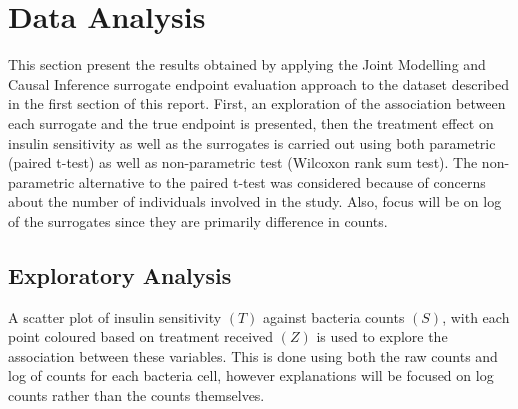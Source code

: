 \documentclass[a4paper,12pt]{article}
\begin{document}
	\section{Data Analysis}
	This section present the results obtained by applying the Joint Modelling and Causal Inference surrogate endpoint evaluation approach to the dataset described in the first section of this report. First, an exploration of the association between each surrogate and the true endpoint is presented, then the treatment effect on insulin sensitivity as well as the surrogates is carried out using both parametric (paired t-test\citep{DNAmicroarray}) as well as non-parametric test (Wilcoxon rank sum test\citep{DNAmicroarray}). The non-parametric alternative to the paired t-test was considered because of concerns about the number of individuals involved in the study. Also, focus will be on log of the surrogates since they are primarily difference in counts.
	
	\subsection{Exploratory Analysis}
	A scatter plot of insulin sensitivity $(T)$ against bacteria counts $(S)$, with each point coloured based on treatment received $(Z)$ is used to explore the association between these variables. This is done using both the raw counts and log of counts for each bacteria cell, however explanations will be focused on log counts rather than the counts themselves.
	
\end{document}
